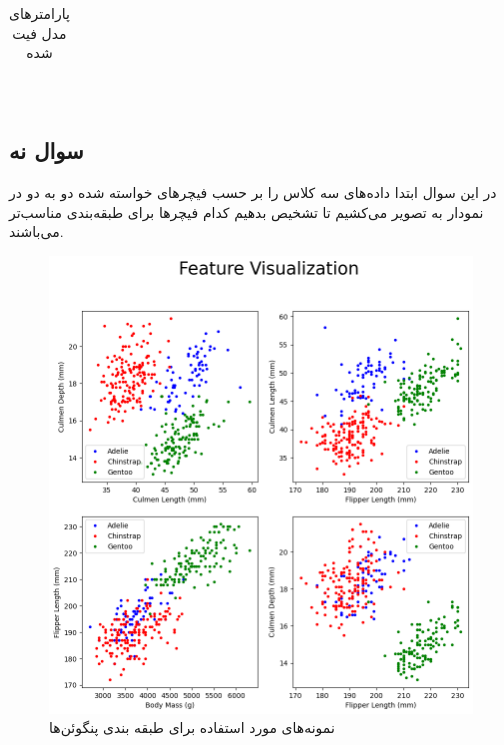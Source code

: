 \documentclass[12pt,onecolumn,a4paper]{article}
\begin{document}
\begin{center}
\begin{table}[h]
\begin{centering}
\begin{tabular}{|c|ccc|ccc|}
        \end{tabular}
    \end{centering}
    \caption{پارامترهای مدل فیت شده}
\end{table}
\end{center}

\newpage~\newpage
\subsection{سوال نه}
در این سوال ابتدا داده‌های سه کلاس را بر حسب فیچرهای خواسته شده دو به دو در نمودار به تصویر می‌کشیم تا تشخیص بدهیم کدام فیچرها برای طبقه‌بندی مناسب‌تر می‌باشند.

\begin{figure}[h!]
    \label{fig:3}
    \begin{center}
    \includegraphics[scale=0.6]{q9_feature_comp.png}
    \caption{نمونه‌های مورد استفاده برای طبقه بندی پنگوئن‌ها}
    \end{center}
\end{figure}
\end{document}
